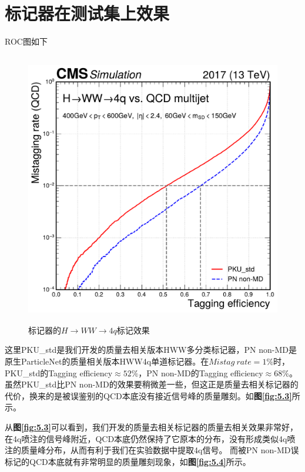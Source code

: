 \section{标记器在测试集上效果}
ROC图如下
\begin{figure}[H]\label{fig:5.2}
 \centering
 \caption{标记器的$H\to WW\to 4q$标记效果}
 \includegraphics[height=12cm, width=12cm]{pictures/ROC_HWW_4q.pdf}
\end{figure}
这里PKU\_std是我们开发的质量去相关版本HWW多分类标记器，PN non-MD是原生ParticleNet的质量相关版本HWW4q单道标记器。在$Mistag\ rate=1\%$时，PKU\_std的Tagging efficiency$\approx52\%$，PN non-MD的Tagging efficiency$\approx68\%$。虽然PKU\_std比PN non-MD的效果要稍微差一些，但这正是质量去相关标记器的代价，换来的是被误鉴别的QCD本底没有接近信号峰的质量雕刻。如\textbf{图\ref{fig:5.3}}所示。

从\textbf{图\ref{fig:5.3}}可以看到，我们开发的质量去相关标记器的质量去相关效果非常好，在4q喷注的信号峰附近，QCD本底仍然保持了它原本的分布，没有形成类似4q喷注的质量峰分布，从而有利于我们在实验数据中提取4q信号。
而被PN non-MD误标记的QCD本底就有非常明显的质量雕刻现象，如\textbf{图\ref{fig:5.4}}所示。

